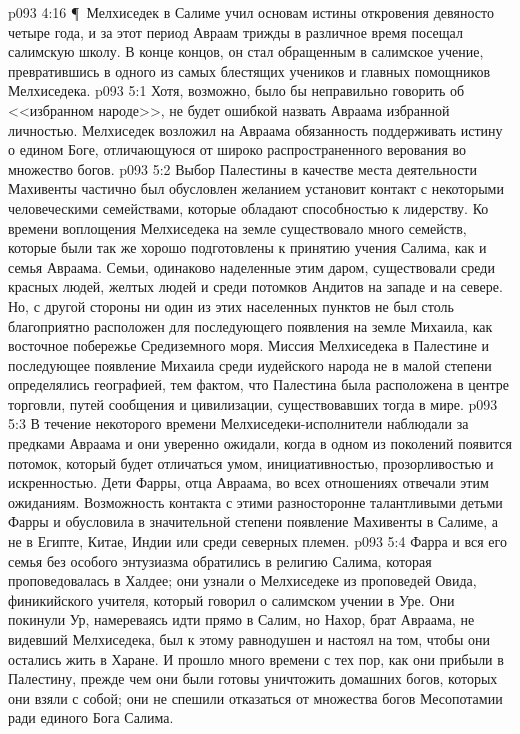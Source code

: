 \vs p093 4:16 \P\ Мелхиседек в Салиме учил основам истины откровения девяносто четыре года, и за этот период Авраам трижды в различное время посещал салимскую школу. В конце концов, он стал обращенным в салимское учение, превратившись в одного из самых блестящих учеников и главных помощников Мелхиседека.
\vs p093 5:1 Хотя, возможно, было бы неправильно говорить об <<избранном народе>>, не будет ошибкой назвать Авраама избранной личностью. Мелхиседек возложил на Авраама обязанность поддерживать истину о едином Боге, отличающуюся от широко распространенного верования во множество богов.
\vs p093 5:2 Выбор Палестины в качестве места деятельности Махивенты частично был обусловлен желанием установит контакт с некоторыми человеческими семействами, которые обладают способностью к лидерству. Ко времени воплощения Мелхиседека на земле существовало много семейств, которые были так же хорошо подготовлены к принятию учения Салима, как и семья Авраама. Семьи, одинаково наделенные этим даром, существовали среди красных людей, желтых людей и среди потомков Андитов на западе и на севере. Но, с другой стороны ни один из этих населенных пунктов не был столь благоприятно расположен для последующего появления на земле Михаила, как восточное побережье Средиземного моря. Миссия Мелхиседека в Палестине и последующее появление Михаила среди иудейского народа не в малой степени определялись географией, тем фактом, что Палестина была расположена в центре торговли, путей сообщения и цивилизации, существовавших тогда в мире.
\vs p093 5:3 В течение некоторого времени Мелхиседеки\hyp{}исполнители наблюдали за предками Авраама и они уверенно ожидали, когда в одном из поколений появится потомок, который будет отличаться умом, инициативностью, прозорливостью и искренностью. Дети Фарры, отца Авраама, во всех отношениях отвечали этим ожиданиям. Возможность контакта с этими разносторонне талантливыми детьми Фарры и обусловила в значительной степени появление Махивенты в Салиме, а не в Египте, Китае, Индии или среди северных племен.
\vs p093 5:4 Фарра и вся его семья без особого энтузиазма обратились в религию Салима, которая проповедовалась в Халдее; они узнали о Мелхиседеке из проповедей Овида, финикийского учителя, который говорил о салимском учении в Уре. Они покинули Ур, намереваясь идти прямо в Салим, но Нахор, брат Авраама, не видевший Мелхиседека, был к этому равнодушен и настоял на том, чтобы они остались жить в Харане. И прошло много времени с тех пор, как они прибыли в Палестину, прежде чем они были готовы уничтожить  домашних богов, которых они взяли с собой; они не спешили отказаться от множества богов Месопотамии ради единого Бога Салима.
